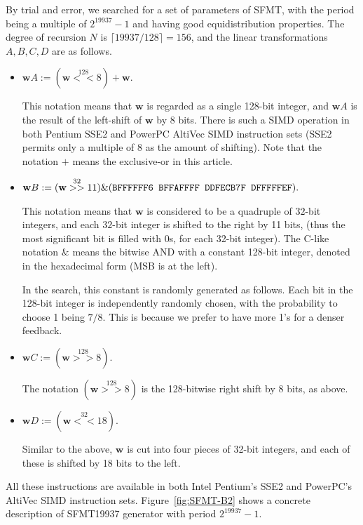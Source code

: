 \documentclass[acmnow]{acmtrans2m}
\def\bw{{{\mathbf w}}}
\begin{document}
By trial and error, 
we searched for a set of parameters of SFMT,
with the period being a multiple of $2^{19937}-1$
and having good equidistribution properties.
The degree of recursion $N$ is $\lceil 19937/128 \rceil=156$, 
and the linear transformations $A,B,C,D$ are as follows.
\begin{itemize}
\item 
$\bw A := (\bw \stackrel{128}{<<} 8) + \bw.$

This notation means that $\bw$ is regarded
as a single 128-bit integer, and 
$\bw A$ is the result of the left-shift
of $\bw$ by 8 bits. There is such a SIMD operation
in both Pentium SSE2 and PowerPC AltiVec SIMD instruction 
sets (SSE2 permits only a multiple of 8
as the amount of shifting). 
Note that the notation $+$ means the exclusive-or
in this article.

\item
$\bw B := (\bw \stackrel{32}{>>} 11) \& (\mbox{\tt BFFFFFF6 BFFAFFFF DDFECB7F DFFFFFEF}).$

This notation means that $\bw$ is considered to be 
a quadruple of $32$-bit integers, and
each $32$-bit integer is shifted to the right by 11 bits,
(thus the most significant bit is filled with 0s, 
for each 32-bit integer).
The C-like notation $\&$ means the bitwise AND
with a constant 128-bit integer,
denoted in the hexadecimal form
(MSB is at the left). 

In the search,
this constant is randomly generated as follows. 
Each bit in the 128-bit integer is independently 
randomly chosen, with the probability to choose 1 being $7/8$.
This is because we prefer to have more 1's for a denser 
feedback.

\item 
$\bw C := (\bw \stackrel{128}{>>} 8).$

The notation 
$(\bw \stackrel{128}{>>} 8)$ is the 128-bitwise right shift 
by 8 bits, as above.

\item
$\bw D := (\bw \stackrel{32}{<<} 18).$

Similar to the above,
$\bw$ is cut into four pieces of 32-bit integers,
and each of these is shifted by 18 bits to the left.
\end{itemize}
All these instructions are available in 
both Intel Pentium's SSE2 and PowerPC's AltiVec SIMD instruction sets.
Figure~\ref{fig:SFMT-B2} shows a concrete description
of SFMT19937 generator with period $2^{19937}-1$.
\end{document}
